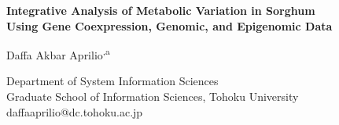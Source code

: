 
\begin{titlepage}
    \centering
    \vspace*{2cm}

    {\LARGE\bfseries Integrative Analysis of Metabolic Variation in Sorghum \\
    Using Gene Coexpression, Genomic, and Epigenomic Data\par}

    \vspace{2cm}

    {\large Daffa Akbar Aprilio\textsuperscript{,a}\par}
    \vfill

    \begin{flushleft}
    \small
    Department of System Information Sciences\\
    \makebox[1.5em][l]{}Graduate School of Information Sciences, Tohoku University\\
    daffaaprilio@dc.tohoku.ac.jp
    \end{flushleft}

\end{titlepage}
